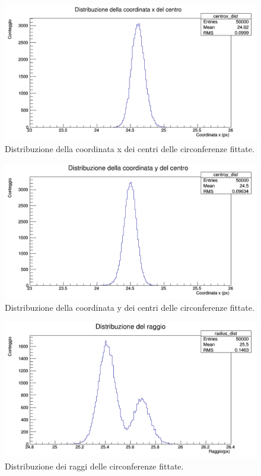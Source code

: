 \documentclass[8pt]{extarticle}
\begin{document}
\begin{figure}
\begin{center}
\includegraphics[scale=0.4]{centrox_dist}
\caption{Distribuzione della coordinata x dei centri delle circonferenze fittate.}
\label{centrox_dist}
\end{center}
\end{figure}

\begin{figure}
\begin{center}
\includegraphics[scale=0.4]{centroy_dist}
\caption{Distribuzione della coordinata y dei centri delle circonferenze fittate.}
\label{centroy_dist}
\end{center}
\end{figure}

\begin{figure}
\begin{center}
\includegraphics[scale=0.4]{radius_dist}
\caption{Distribuzione dei raggi delle circonferenze fittate.}
\label{radius_dist}
\end{center}
\end{figure}
\end{document}
